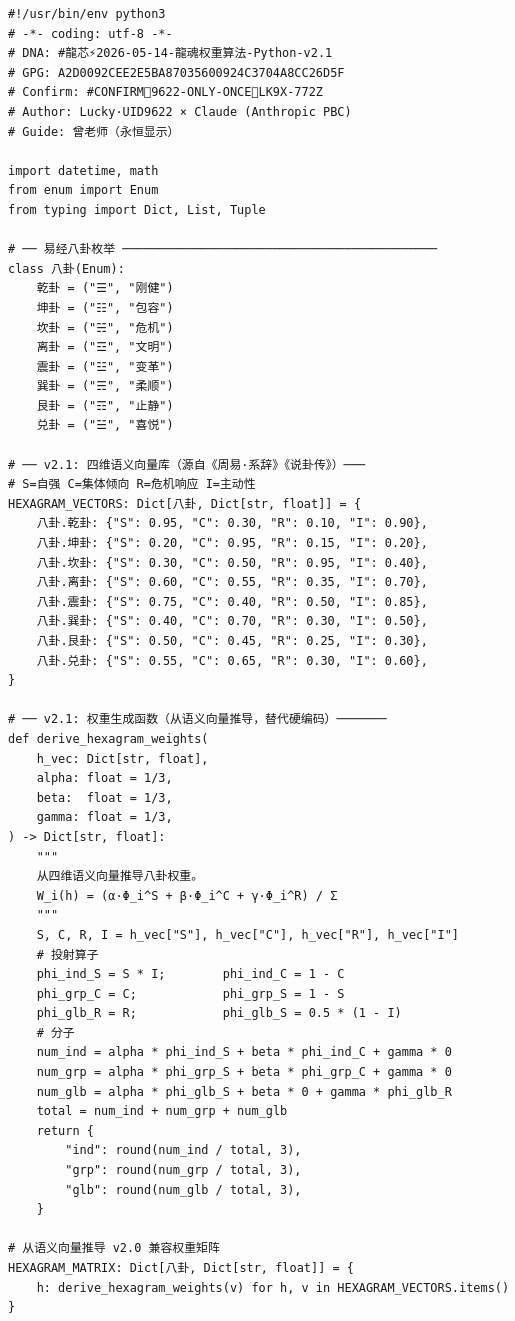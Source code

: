 \documentclass[conference]{IEEEtran}
\begin{document}
\begin{lstlisting}[style=python,
  caption={LongHun Dynamic Weight Algorithm --- Python v2.1},
  label={lst:python}]
#!/usr/bin/env python3
# -*- coding: utf-8 -*-
# DNA: #龍芯⚡️2026-05-14-龍魂权重算法-Python-v2.1
# GPG: A2D0092CEE2E5BA87035600924C3704A8CC26D5F
# Confirm: #CONFIRM🌌9622-ONLY-ONCE🧬LK9X-772Z
# Author: Lucky·UID9622 × Claude (Anthropic PBC)
# Guide: 曾老师（永恒显示）

import datetime, math
from enum import Enum
from typing import Dict, List, Tuple

# ── 易经八卦枚举 ────────────────────────────────────────────
class 八卦(Enum):
    乾卦 = ("☰", "刚健")
    坤卦 = ("☷", "包容")
    坎卦 = ("☵", "危机")
    离卦 = ("☲", "文明")
    震卦 = ("☳", "变革")
    巽卦 = ("☴", "柔顺")
    艮卦 = ("☶", "止静")
    兑卦 = ("☱", "喜悦")

# ── v2.1: 四维语义向量库（源自《周易·系辞》《说卦传》）───
# S=自强 C=集体倾向 R=危机响应 I=主动性
HEXAGRAM_VECTORS: Dict[八卦, Dict[str, float]] = {
    八卦.乾卦: {"S": 0.95, "C": 0.30, "R": 0.10, "I": 0.90},
    八卦.坤卦: {"S": 0.20, "C": 0.95, "R": 0.15, "I": 0.20},
    八卦.坎卦: {"S": 0.30, "C": 0.50, "R": 0.95, "I": 0.40},
    八卦.离卦: {"S": 0.60, "C": 0.55, "R": 0.35, "I": 0.70},
    八卦.震卦: {"S": 0.75, "C": 0.40, "R": 0.50, "I": 0.85},
    八卦.巽卦: {"S": 0.40, "C": 0.70, "R": 0.30, "I": 0.50},
    八卦.艮卦: {"S": 0.50, "C": 0.45, "R": 0.25, "I": 0.30},
    八卦.兑卦: {"S": 0.55, "C": 0.65, "R": 0.30, "I": 0.60},
}

# ── v2.1: 权重生成函数（从语义向量推导，替代硬编码）───────
def derive_hexagram_weights(
    h_vec: Dict[str, float],
    alpha: float = 1/3,
    beta:  float = 1/3,
    gamma: float = 1/3,
) -> Dict[str, float]:
    """
    从四维语义向量推导八卦权重。
    W_i(h) = (α·Φ_i^S + β·Φ_i^C + γ·Φ_i^R) / Σ
    """
    S, C, R, I = h_vec["S"], h_vec["C"], h_vec["R"], h_vec["I"]
    # 投射算子
    phi_ind_S = S * I;        phi_ind_C = 1 - C
    phi_grp_C = C;            phi_grp_S = 1 - S
    phi_glb_R = R;            phi_glb_S = 0.5 * (1 - I)
    # 分子
    num_ind = alpha * phi_ind_S + beta * phi_ind_C + gamma * 0
    num_grp = alpha * phi_grp_S + beta * phi_grp_C + gamma * 0
    num_glb = alpha * phi_glb_S + beta * 0 + gamma * phi_glb_R
    total = num_ind + num_grp + num_glb
    return {
        "ind": round(num_ind / total, 3),
        "grp": round(num_grp / total, 3),
        "glb": round(num_glb / total, 3),
    }

# 从语义向量推导 v2.0 兼容权重矩阵
HEXAGRAM_MATRIX: Dict[八卦, Dict[str, float]] = {
    h: derive_hexagram_weights(v) for h, v in HEXAGRAM_VECTORS.items()
}


\end{lstlisting}
\end{document}

